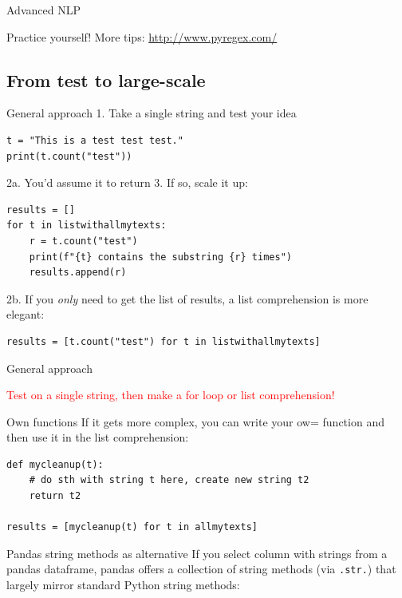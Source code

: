 \documentclass[compress]{beamer}
\begin{document}
\begin{section}{Advanced NLP}
\begin{frame}{Practice yourself!}
More tips:
\huge{\url{http://www.pyregex.com/}}
\end{frame}



\section{From test to large-scale}

\begin{frame}[fragile]{General approach}
1. Take a single string and test your idea
\begin{lstlisting}
t = "This is a test test test."
print(t.count("test"))
\end{lstlisting}
2a. You'd assume it to return 3. If so, scale it up:
\begin{lstlisting}
results = []
for t in listwithallmytexts:
    r = t.count("test")
    print(f"{t} contains the substring {r} times")
    results.append(r)
\end{lstlisting}

2b. If you \emph{only} need to get the list of results, a list comprehension is more elegant:
\begin{lstlisting}
results = [t.count("test") for t in listwithallmytexts]
\end{lstlisting}


\end{frame}


\begin{frame}[fragile]{General approach}
\Large

\textcolor{red}{Test on a single string, then make a for loop or list comprehension!}

\pause

\normalsize

\begin{alertblock}{Own functions}
If it gets more complex, you can write your ow= function and then use it in the list comprehension:
\begin{lstlisting}
def mycleanup(t):
    # do sth with string t here, create new string t2
    return t2

results = [mycleanup(t) for t in allmytexts]
\end{lstlisting}
\end{alertblock}
\end{frame}


\begin{frame}[fragile]{Pandas string methods as alternative}
If you select column with strings from a pandas dataframe, pandas offers a collection of string methods (via \texttt{.str.}) that largely mirror standard Python string methods:


\end{frame}
\end{section}
\end{document}
